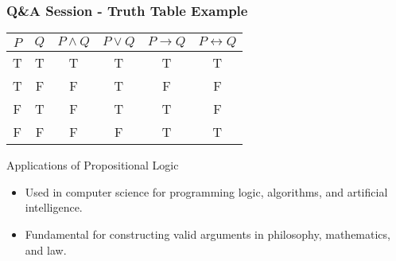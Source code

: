 \documentclass[aspectratio=169]{beamer}
\begin{document}
\begin{frame}[fragile]
  \frametitle{Q\&A Session - Truth Table Example}
  \begin{center}
    \begin{tabular}{|c|c|c|c|c|c|}
      \hline
      \( P \) & \( Q \) & \( P \land Q \) & \( P \lor Q \) & \( P \rightarrow Q \) & \( P \leftrightarrow Q \) \\
      \hline
      T & T & T & T & T & T \\
      T & F & F & T & F & F \\
      F & T & F & T & T & F \\
      F & F & F & F & T & T \\
      \hline
    \end{tabular}
  \end{center}

  \begin{block}{Applications of Propositional Logic}
    \begin{itemize}
      \item Used in computer science for programming logic, algorithms, and artificial intelligence.
      \item Fundamental for constructing valid arguments in philosophy, mathematics, and law.
    \end{itemize}
  \end{block}
\end{frame}
\end{document}
